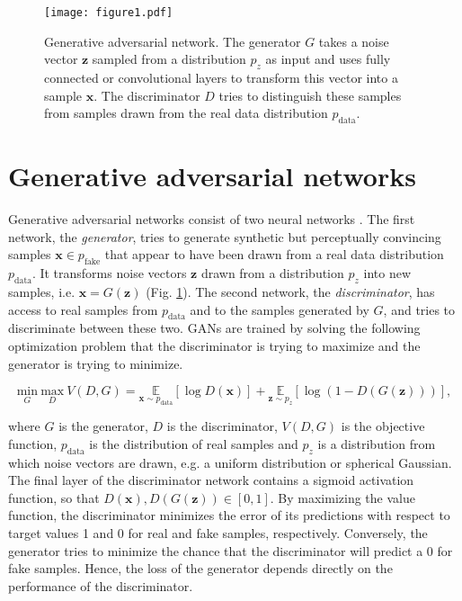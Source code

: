 \documentclass{article}
\begin{document}
\begin{figure}
\centering
\texttt{[image: figure1.pdf]}
\caption{Generative adversarial network. The generator $G$ takes a noise vector $\mathbf{z}$ sampled from a distribution $p_z$ as input and uses fully connected or convolutional layers to transform this vector into a sample $\mathbf{x}$. The discriminator $D$ tries to distinguish these samples from samples drawn from the real data distribution $p_{\text{data}}$.}
\label{fig:gan}
\end{figure}


\section{Generative adversarial networks}
\label{sec:GANS}
Generative adversarial networks consist of two neural networks \cite{Good14}. The first network, the \textit{generator}, tries to generate synthetic but perceptually convincing samples $\mathbf{x} \in p_{\text{fake}}$ that appear to have been drawn from a real data distribution $p_{\text{data}}$. It transforms noise vectors $\mathbf{z}$ drawn from a distribution $p_z$ into new samples, i.e. $\mathbf{x}=G(\mathbf{z})$ (Fig. \ref{fig:gan}). The second network, the \textit{discriminator}, has access to real samples from $p_{\text{data}}$ and to the samples generated by $G$, and tries to discriminate between these two. GANs are trained by solving the following optimization problem that the discriminator is trying to maximize and the generator is trying to minimize.

\begin{equation}
\underset{G}{\text{min}}~\underset{D}{\text{max}}~V(D,G)=\underset{\mathbf{x}\sim p_{\text{data}}}{\mathds{E}} [\log{D(\mathbf{x})}]+\underset{\mathbf{z}\sim p_z}{\mathds{E}} [\log{(1-D(G(\mathbf{z})))}],
\label{eq:gan}
\end{equation}

where $G$ is the generator, $D$ is the discriminator, $V(D,G)$ is the objective function, $p_{\text{data}}$ is the distribution of real samples and $p_z$ is a distribution from which noise vectors are drawn, e.g. a uniform distribution or spherical Gaussian. The final layer of the discriminator network contains a sigmoid activation function, so that $D(\mathbf{x}), D(G(\mathbf{z}))\in [0,1]$. By maximizing the value function, the discriminator minimizes the error of its predictions with respect to target values 1 and 0 for real and fake samples, respectively. Conversely, the generator tries to minimize the chance that the discriminator will predict a 0 for fake samples. Hence, the loss of the generator depends directly on the performance of the discriminator. 
\end{document}
